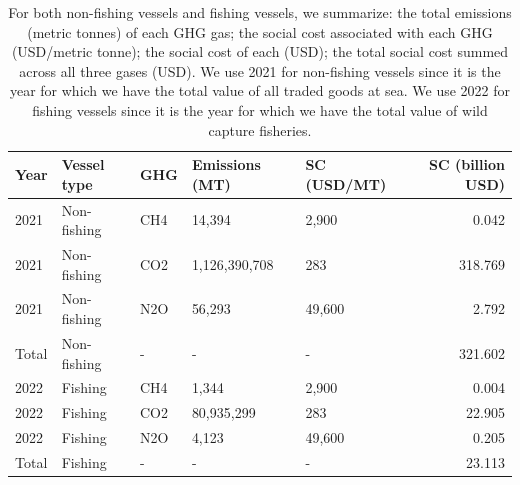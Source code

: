 \begin{table}[!h]
\centering
\caption{\label{tab:social_cost_summary_tbl}For both non-fishing vessels and fishing vessels, we summarize: the total emissions (metric tonnes) of each GHG gas; the social cost associated with each GHG (USD/metric tonne); the social cost of each (USD); the total social cost summed across all three gases (USD). We use 2021 for non-fishing vessels since it is the year for which we have the total value of all traded goods at sea. We use 2022 for fishing vessels since it is the year for which we have the total value of wild capture fisheries.}
\centering
\fontsize{8}{10}\selectfont
\begin{tabular}[t]{l|l|l|l|l|r}
\hline
Year & Vessel type & GHG & Emissions (MT) & SC (USD/MT) & SC (billion USD)\\
\hline
2021 & Non-fishing & CH4 & 14,394 & 2,900 & 0.042\\
\hline
2021 & Non-fishing & CO2 & 1,126,390,708 & 283 & 318.769\\
\hline
2021 & Non-fishing & N2O & 56,293 & 49,600 & 2.792\\
\hline
Total & Non-fishing & - & - & - & 321.602\\
\hline
2022 & Fishing & CH4 & 1,344 & 2,900 & 0.004\\
\hline
2022 & Fishing & CO2 & 80,935,299 & 283 & 22.905\\
\hline
2022 & Fishing & N2O & 4,123 & 49,600 & 0.205\\
\hline
Total & Fishing & - & - & - & 23.113\\
\hline
\end{tabular}
\end{table}
